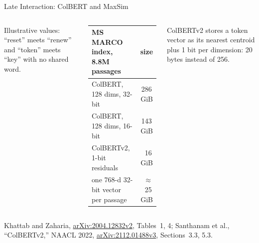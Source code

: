 \begin{frame}{Late Interaction: ColBERT and MaxSim}
\begin{columns}[T,onlytextwidth]
      {\scriptsize Illustrative values: ``reset'' meets ``renew'' and ``token'' meets ``key'' with no shared word.\par}\vspace{0.4em}
      {\scriptsize
      \begin{tabular}{lr}
        \toprule
        MS MARCO index, 8.8M passages & size \\
        \midrule
        ColBERT, 128 dims, 32-bit & 286\,GiB \\
        ColBERT, 128 dims, 16-bit & 143\,GiB \\
        ColBERTv2, 1-bit residuals & 16\,GiB \\
        one 768-d 32-bit vector per passage & $\approx$25\,GiB \\
        \bottomrule
      \end{tabular}\par}
      \vspace{0.2em}
      {\scriptsize ColBERTv2 stores a token vector as its nearest centroid plus 1 bit per dimension: 20 bytes instead of 256.\par}
  \end{columns}
  \vspace{0.1em}
  {\scriptsize Khattab and Zaharia, \href{https://arxiv.org/abs/2004.12832v2}{arXiv:2004.12832v2}, Tables~1, 4; Santhanam et al., ``ColBERTv2,'' NAACL 2022, \href{https://arxiv.org/abs/2112.01488v3}{arXiv:2112.01488v3}, Sections~3.3, 5.3.\par}
\end{frame}

